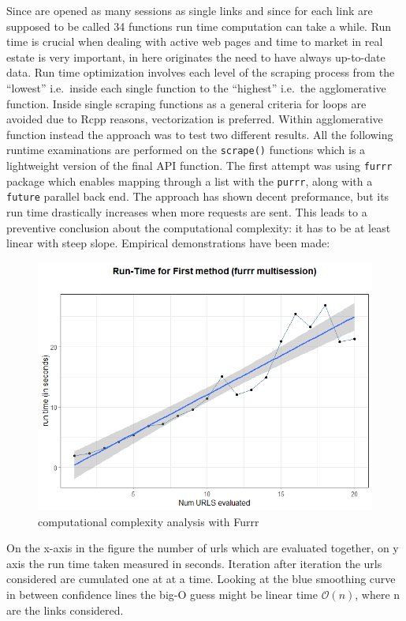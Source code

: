 \documentclass[
  12pt,
  a4paper,
  oneside]{book}
\begin{document}
Since are opened as many sessions as single links and since for each link are supposed to be called 34 functions run time computation can take a while. Run time is crucial when dealing with active web pages and time to market in real estate is very important, in here originates the need to have always up-to-date data. Run time optimization involves each level of the scraping process from the ``lowest'' i.e.~inside each single function to the ``highest'' i.e.~the agglomerative function. Inside single scraping functions as a general criteria for loops are avoided due to Rcpp reasons, vectorization is preferred. Within agglomerative function instead the approach was to test two different results. All the following runtime examinations are performed on the \texttt{scrape()} functions which is a lightweight version of the final API function.
The first attempt was using \texttt{furrr} package \citep{furrr} which enables mapping through a list with the \texttt{purrr}, along with a \texttt{future} parallel back end. The approach has shown decent preformance, but its run time drastically increases when more requests are sent. This leads to a preventive conclusion about the computational complexity: it has to be at least linear with steep slope. Empirical demonstrations have been made:

\begin{figure}
\centering
\includegraphics{images/run_timefurrr.png}
\caption{computational complexity analysis with Furrr}
\end{figure}

On the x-axis in the figure the number of urls which are evaluated together, on y axis the run time taken measured in seconds. Iteration after iteration the urls considered are cumulated one at at a time. Looking at the blue smoothing curve in between confidence lines the big-O guess might be linear time \(\mathcal{O}(n)\), where n are the links considered.
\end{document}
